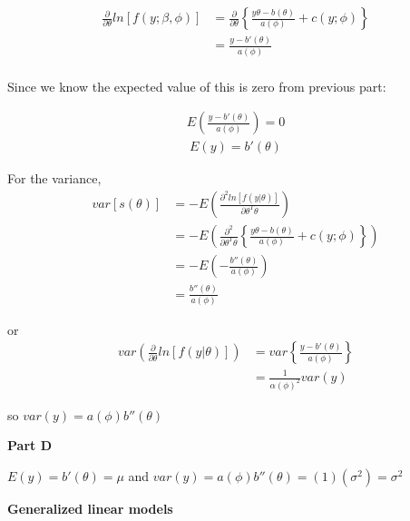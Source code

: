 \documentclass[12pt]{amsart}
\begin{document}
\begin{align*}
   \frac{\partial}{\partial \theta}ln[f(y; \beta, \phi)] &=  \frac{\partial}{\partial \theta} \left\{ \frac{y\theta-b(\theta)}{a(\phi)}+c(y;\phi) \right\}\\
   &= \frac{y-b'(\theta)}{a(\phi)}\\
\end{align*}

Since we know the expected value of this is zero from previous part:

\begin{align*}
   E\left(\frac{y-b'(\theta)}{a(\phi)}\right)=0
\end{align*}
\begin{align*}
   E(y) = b'(\theta)
\end{align*}

For the variance, 
\begin{align*}
    var[s(\theta)] &=-E\left(\frac{\partial^2 ln[f(y|\theta)]}{\partial \theta^T\theta} \right ) \\
    &=-E\left(\frac{\partial^2}{\partial \theta^T\theta}\left\{ \frac{y\theta-b(\theta)}{a(\phi)}+c(y;\phi) \right\} \right )\\
    &=-E\left( -\frac{b''(\theta)}{a(\phi)}\right )\\
    &=  \frac{b''(\theta)}{a(\phi)}
\end{align*}


or 
\begin{align*}
   var( \frac{\partial}{\partial \theta }ln[f(y|\theta)])
    &=var\left\{ \frac{y-b'(\theta)}{a(\phi)}\right\}\\
    &= \frac{1}{\alpha(\phi)^2}var(y)
\end{align*}

so $var(y)=a(\phi)b''(\theta)$


\bigskip
{\bf Part D} \\
\bigskip

$E(y)= b'(\theta)=\mu$ and $var(y)=a(\phi)b''(\theta)=(1)(\sigma^2)=\sigma^2$\\

\bigskip

{\bf \large Generalized linear models} 
\bigskip
\end{document}
